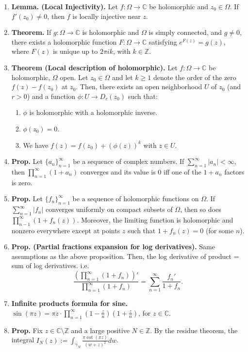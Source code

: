 \documentclass[12pt]{article}
\theoremstyle{definition}
\theoremstyle{named}
\begin{document}
{\begin{multicols}{2}
\begin{spacing}{1.01}
\begin{enumerate}
    \item \textbf{Lemma. (Local Injectivity). } Let $f: \Omega \to \mathbb{C}$ be holomorphic and $z_0 \in \Omega$. If $f'(z_0) \neq 0$, then $f$ is locally injective near $z$. 
    \item \textbf{Theorem. } If $g: \Omega \to \mathbb{C}$ is holomorphic and $\Omega$ is simply connected, and $g \neq 0$, there exists a holomorphic function $F: \Omega \to \mathbb{C}$ satisfying $e^{F(z)} = g(z)$, where $F(z)$ is unique up to $2\pi ik$, with $k \in \mathbb{Z}$. 
    \item \textbf{Theorem (Local description of holomorphic). } Let $f: \Omega \to \mathbb{C}$ be holomorphic, $\Omega$ open. Let $z_0 \in \Omega$ and let $k \geq 1$ denote the order of the zero $f(z) - f(z_0)$ at $z_0$. Then, there exists an open neighborhood $U$ of $z_0$ (and $r>0$) and a function $\phi: U \to D_r(z_0)$ such that: 
    \begin{enumerate}
        \item $\phi$ is holomorphic with a holomorphic inverse. 
        \item $\phi(z_0) = 0$. 
        \item We have $f(z) = f(z_0) + (\phi(z))^k$ with $z \in U$. 
    \end{enumerate}
    \item \textbf{Prop. } Let $\{a_n\}_{n=1}^{\infty}$ be a sequence of complex numbers. If $\sum_{n=1}^{\infty}|a_n| < \infty$, then $\prod_{n=1}^{\infty}(1+a_n)$ converges and its value is 0 iff one of the $1+a_n$ factors is zero. 
    \item \textbf{Prop. } Let $\{f_n\}_{n=1}^{\infty}$ be a sequence of holomorphic functions on $\Omega$. If $\sum_{n=1}^{\infty}|f_n|$ converges uniformly on compact subsets of $\Omega$, then so does $\prod_{n-1}^{\infty}(1 + f_n(z))$. Moreover, the limiting function is holomorphic and nonzero everywhere except at points $z$ such that $1 + f_n(z) = 0$ (for some $n$). 
    \item \textbf{Prop. (Partial fractions expansion for log derivatives). } Same assumptions as the above proposition. Then, the log derivative of product = sum of log derivatives. i.e. 
    $$
    \frac{\left(\prod_{n=1}^{\infty}(1+f_n)\right)'}{\prod_{n=1}^{\infty}(1+f_n)} = \sum_{n=1}^{\infty} \frac{f_n'}{1 + f_n}. 
    $$
    \item \textbf{Infinite products formula for sine. } $\sin(\pi z) = \pi z \cdot \prod_{n=1}^{\infty}(1 - \frac{z}{n})(1 + \frac{z}{n})$, for $z \in \mathbb{C}$. 
    \item \textbf{Prop. } Fix $z \in \mathbb{C} \setminus \mathbb{Z}$ and a large positive $N \in \mathbb{Z}$. By the residue theorem, the integral $I_N(z) := \int_{\gamma_N} \frac{\pi\cot(\pi z)}{(w+z)^2} dw$. 

\end{enumerate}
\end{spacing}
\end{multicols}}
\end{document}
